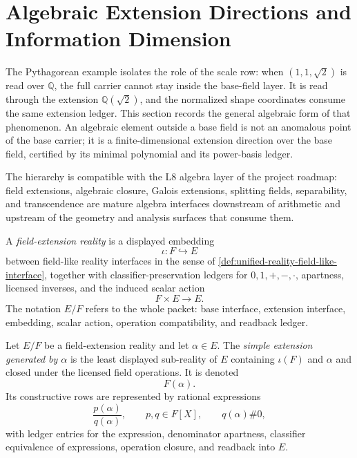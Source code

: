 \section{Algebraic Extension Directions and Information Dimension}
\label{sec:unified-reality-algebraic-extension-information-dimension}

The Pythagorean example isolates the role of the scale row: when
$(1,1,\sqrt{2})$ is read over $\mathbb Q$, the full carrier cannot stay
inside the base-field layer. It is read through the extension
$\mathbb Q(\sqrt{2})$, and the normalized shape coordinates consume the
same extension ledger. This section records the general algebraic form
of that phenomenon. An algebraic element outside a base field is not an
anomalous point of the base carrier; it is a finite-dimensional
extension direction over the base field, certified by its minimal
polynomial and its power-basis ledger.

The hierarchy is compatible with the L8 algebra layer of the project
roadmap: field extensions, algebraic closure, Galois extensions,
splitting fields, separability, and transcendence are mature algebra
interfaces downstream of arithmetic and upstream of the geometry and
analysis surfaces that consume them.

\begin{definition}
\label{def:unified-reality-field-extension-reality}
A \emph{field-extension reality} is a displayed embedding
$$
\iota:F\hookrightarrow E
$$
between field-like reality interfaces in the sense of
\autoref{def:unified-reality-field-like-interface}, together with
classifier-preservation ledgers for $0,1,+,-,\cdot$, apartness,
licensed inverses, and the induced scalar action
$$
F\times E\to E.
$$
The notation $E/F$ refers to the whole packet: base interface, extension
interface, embedding, scalar action, operation compatibility, and
readback ledger.
\end{definition}

\begin{definition}
\label{def:unified-reality-generated-simple-extension}
Let $E/F$ be a field-extension reality and let $\alpha\in E$. The
\emph{simple extension generated by $\alpha$} is the least displayed
sub-reality of $E$ containing $\iota(F)$ and $\alpha$ and closed under
the licensed field operations. It is denoted
$$
F(\alpha).
$$
Its constructive rows are represented by rational expressions
$$
\frac{p(\alpha)}{q(\alpha)},
\qquad
p,q\in F[X],
\qquad
q(\alpha)\#0,
$$
with ledger entries for the expression, denominator apartness,
classifier equivalence of expressions, operation closure, and readback
into $E$.
\end{definition}

